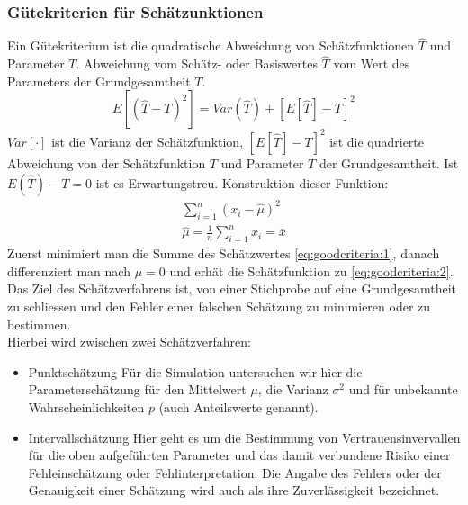 \subsubsection{Gütekriterien für Schätzunktionen}
Ein Gütekriterium ist die quadratische Abweichung von Schätzfunktionen $\widehat{T}$ und Parameter $T$. Abweichung vom Schätz- oder Basiswertes $\widehat{T}$ vom Wert des Parameters der Grundgesamtheit $T$.
\begin{equation}
E[(\widehat{T}-T)^2] = Var(\widehat{T}) + [E[\widehat{T}]-T]^2
\end{equation}
$Var[\cdot]$ ist die Varianz der Schätzfunktion, $[E[\widehat{T}]-T]^2$ ist die quadrierte Abweichung von der Schätzfunktion $T$ und Parameter $T$ der Grundgesamtheit. Ist $E(\widehat{T})-T=0$ ist es Erwartungstreu.
Konstruktion dieser Funktion:
\begin{align}
\sum_{i=1}^n(x_i-\widehat{\mu})^2 \label{eq:goodcriteria:1} \\
\widehat{\mu}=\frac{1}{n}\sum_{i=1}^n x_i = \overline{x} \label{eq:goodcriteria:2}
\end{align}
Zuerst minimiert man die Summe des Schätzwertes \autoref{eq:goodcriteria:1}, danach differenziert man nach $\mu = 0$ und erhät die Schätzfunktion zu \autoref{eq:goodcriteria:2}. \\
Das Ziel des Schätzverfahrens ist, von einer Stichprobe auf eine Grundgesamtheit zu schliessen und den Fehler einer falschen Schätzung zu minimieren oder zu bestimmen.\\
Hierbei wird zwischen zwei Schätzverfahren:
\pagebreak[4]
\begin{itemize}
\item Punktschätzung
\subitem Für die Simulation untersuchen wir hier die Parameterschätzung für den Mittelwert $\mu$, die Varianz $\sigma^2$ und für unbekannte Wahrscheinlichkeiten $p$ (auch Anteilswerte genannt).
\nopagebreak[4]
\item Intervallschätzung
\subitem Hier geht es um die Bestimmung von Vertrauensinvervallen für die oben aufgeführten Parameter und das damit verbundene Risiko einer Fehleinschätzung oder Fehlinterpretation. Die Angabe des Fehlers oder der Genauigkeit einer Schätzung wird auch als ihre Zuverlässigkeit bezeichnet.
\end{itemize}
